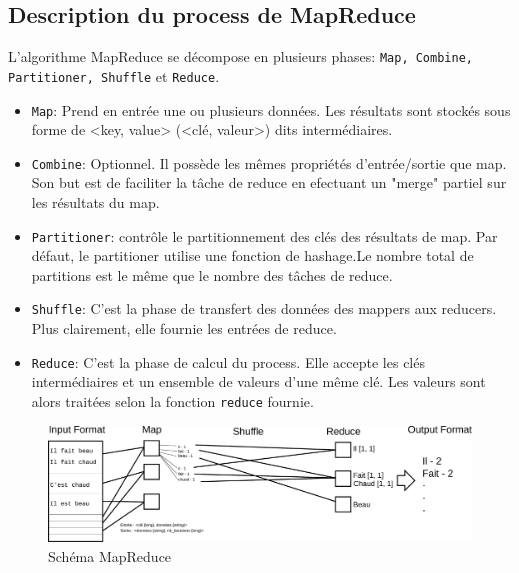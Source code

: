 \documentclass[12pt,a4paper]{article}
\begin{document}
\paragraph{}
\newpage


\subsection{Description du process de MapReduce}
L'algorithme MapReduce se décompose en plusieurs phases: {\tt Map, Combine, Partitioner, Shuffle} et {\tt Reduce}.\\
\begin{itemize}
\item {\tt Map}: Prend en entrée une ou plusieurs données. Les résultats sont stockés sous forme de <key, value> (<clé, valeur>) dits intermédiaires.

\item {\tt Combine}: Optionnel. Il possède les mêmes propriétés d'entrée/sortie que map. Son but est de faciliter la tâche de reduce en efectuant un "merge" partiel\cite{Google} sur les résultats du map.

\item {\tt Partitioner}: contrôle le partitionnement des clés des résultats de map. Par défaut, le partitioner utilise une fonction de hashage.Le nombre total de partitions est le même que le nombre des tâches de reduce. 


\item {\tt Shuffle}: C'est la phase de transfert des données des mappers aux reducers. Plus clairement, elle fournie les entrées de reduce.

\item {\tt Reduce}: C'est la phase de calcul du process. Elle accepte les clés intermédiaires et un ensemble de valeurs d'une même clé. Les valeurs sont alors traitées selon la fonction {\tt reduce} fournie.
\end{itemize}

\begin{figure}[H]
  \centering
    \includegraphics[scale=0.3]{images/shuffle_explication.pdf}
        \caption{Schéma MapReduce}
\end{figure}
\end{document}
